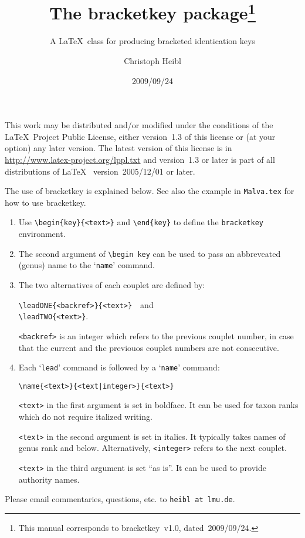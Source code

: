 \documentclass[parskip=half, pagesize=auto, version=last]{scrartcl}
\title{The \textsf{bracketkey} package\thanks{This manual corresponds to \textsf{bracketkey}~v1.0, dated~2009/09/24.}}
\subtitle{A \LaTeX\ class for producing bracketed identication keys}
\author{Christoph Heibl}
\date{2009/09/24}
\begin{document}
\maketitle

\noindent
This work may be distributed and/or modified under the
conditions of the \LaTeX\ Project Public License, either version~1.3
of this license or (at your option) any later version.
The latest version of this license is in
\url{http://www.latex-project.org/lppl.txt}
and version~1.3 or later is part of all distributions of \LaTeX\ %
version~2005/12/01 or later.

The use of \textsf{bracketkey} is explained below. See also the example in 
\texttt{Malva.tex} for how to use \textsf{bracketkey}. 
%
\begin{enumerate}
\item Use \verb+\begin{key}{<text>}+ and \verb+\end{key}+ to define the 
  \texttt{bracketkey} environment.

\item The second argument of \verb+\begin key+ can be used to pass 
  an abbreveated (genus) name to the `\texttt{name}' command.

\item The two alternatives of each couplet are defined by:
  
  \verb+\leadONE{<backref>}{<text>}+~~and \\
  \verb+\leadTWO{<text>}+.
  
  \verb+<backref>+ is an integer which refers to the previous couplet 
  number, in case that the current and the previouos couplet
  numbers are not consecutive.

\item Each `\texttt{lead}' command is followed by a `\texttt{name}' command:
  
  \verb+\name{<text>}{<text|integer>}{<text>}+
  
  \verb+<text>+ in the first argument is set in boldface. It can be used 
  for taxon ranks which do not require italized writing.

  \verb+<text>+ in the second argument is set in italics. It typically 
  takes names of genus rank and below. Alternatively, \verb+<integer>+
  refers to the next couplet.
  
  \verb+<text>+ in the third argument is set ``as is''. It can be used to provide 
  authority names.
\end{enumerate}

Please email commentaries, questions, etc. to \texttt{heibl at lmu.de}.
\end{document}
